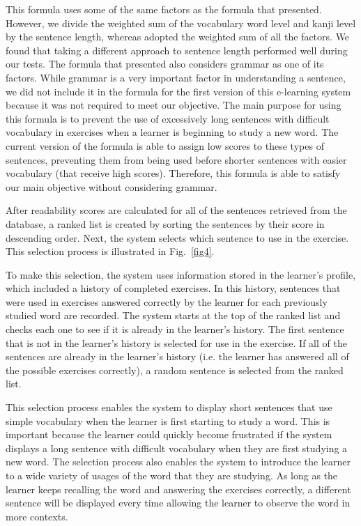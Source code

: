 \documentclass[english]{jnlp_1.4}
\begin{document}
This formula uses some of the same factors as the formula that \cite{Inproc_Mizuno} presented. However, we divide the weighted sum of the vocabulary word level and kanji level by the sentence length, whereas \cite{Inproc_Mizuno} adopted the weighted sum of all the factors. We found that taking a different approach to sentence length performed well during our tests. The formula that \cite{Inproc_Mizuno} presented also considers grammar as one of its factors. While grammar is a very important factor in understanding a sentence, we did not include it in the formula for the first version of this e-learning system because it was not required to meet our objective. The main purpose for using this formula is to prevent the use of excessively long sentences with difficult vocabulary in exercises when a learner is beginning to study a new word. The current version of the formula is able to assign low scores to these types of sentences, preventing them from being used before shorter sentences with easier vocabulary (that receive high scores). Therefore, this formula is able to satisfy our main objective without considering grammar.

After readability scores are calculated for all of the sentences retrieved from the database, a ranked list is created by sorting the sentences by their score in descending order. Next, the system selects which sentence to use in the exercise. This selection process is illustrated in Fig.~\ref{fig4}. 

To make this selection, the system uses information stored in the learner's profile, which included a history of completed exercises. In this history, sentences that were used in exercises answered correctly by the learner for each previously studied word are recorded. The system starts at the top of the ranked list and checks each one to see if it is already in the learner's history. The first sentence that is not in the learner's history is selected for use in the exercise. If all of the sentences are already in the learner's history (i.e. the learner has answered all of the possible exercises correctly), a random sentence is selected from the ranked list. 

This selection process enables the system to display short sentences that use simple vocabulary when the learner is first starting to study a word. This is important because the learner could quickly become frustrated if the system displays a long sentence with difficult vocabulary when they are first studying a new word. The selection process also enables the system to introduce the learner to a wide variety of usages of the word that they are studying. As long as the learner keeps recalling the word and answering the exercises correctly, a different sentence will be displayed every time allowing the learner to observe the word in more contexts.
\end{document}
